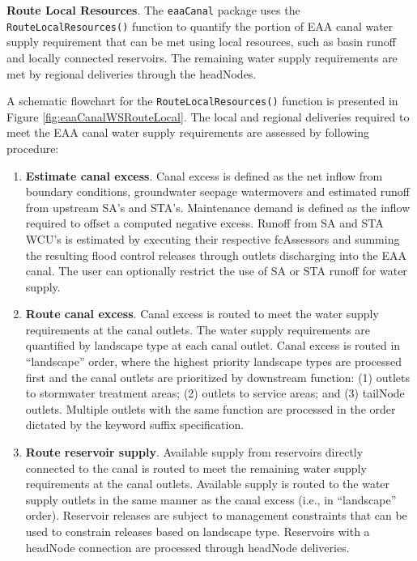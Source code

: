 {\bf Route Local Resources}.  The {\tt eaaCanal} package uses the {\tt
RouteLocalResources()} function to quantify the portion of EAA canal
water supply requirement that can be met using local resources, such
as basin runoff and locally connected reservoirs.  The remaining water
supply requirements are met by regional deliveries through the
headNodes.

A schematic flowchart for the {\tt RouteLocalResources()} function is
presented in Figure \ref {fig:eaaCanalWSRouteLocal}.  The local and
regional deliveries required to meet the EAA canal water supply
requirements are assessed by following procedure:

\begin{enumerate}

  \item {\bf Estimate canal excess}.  Canal excess is defined as the
  net inflow from boundary conditions, groundwater seepage
  watermovers and estimated runoff from upstream SA's and STA's.
  Maintenance demand is defined as the inflow required to offset a
  computed negative excess.  Runoff from SA and STA WCU's is
  estimated by executing their respective fcAssessors and summing the
  resulting flood control releases through outlets discharging into
  the EAA canal.  The user can optionally restrict the use of SA or
  STA runoff for water supply.

  \item {\bf Route canal excess}.  Canal excess is routed to meet the
  water supply requirements at the canal outlets.  The water supply
  requirements are quantified by landscape type at each canal outlet.
  Canal excess is routed in ``landscape'' order, where the highest
  priority landscape types are processed first and the canal outlets are
  prioritized by downstream function: (1) outlets to stormwater
  treatment areas; (2) outlets to service areas; and (3) tailNode
  outlets.  Multiple outlets with the same function are processed in
  the order dictated by the keyword suffix specification.

  \item {\bf Route reservoir supply}.  Available supply from reservoirs
  directly connected to the canal is routed to meet the remaining
  water supply requirements at the canal outlets.  Available supply is
  routed to the water supply outlets in the same manner as the canal
  excess (i.e., in ``landscape'' order).  Reservoir releases are
  subject to management constraints that can be used to constrain
  releases based on landscape type.  Reservoirs with a headNode
  connection are processed through headNode deliveries.


\end{enumerate}

